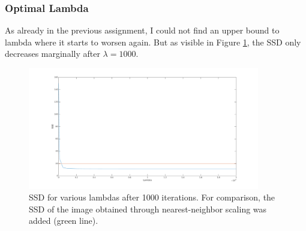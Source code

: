 \documentclass{paper}
\begin{document}
\subsubsection*{Optimal Lambda}
As already in the previous assignment, I could not find an upper bound to lambda where it starts to worsen again. But as visible in Figure \ref{fig:lambda_vs_ssd}, the SSD only decreases marginally after $\lambda=1000$.

\begin{figure}[ht!]%
\centering
\includegraphics[width=0.9\textwidth]{lambda_vs_ssd.png}
\caption{SSD for various lambdas after 1000 iterations. For comparison, the
SSD of the image obtained through nearest-neighbor scaling was added (green line).}
\label{fig:lambda_vs_ssd}
\end{figure}
\end{document}
